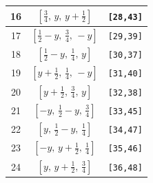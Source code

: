 \documentclass[fleqn,8pt]{jsarticle}
\begin{document}
\begin{longtable}{ccc}
16 & $\left[ \frac{3}{4},\, y,\, y + \frac{1}{2} \right]$ & {\tt [28,43]} \\ \hline
17 & $\left[ \frac{1}{2} - y,\, \frac{3}{4},\, - y \right]$ & {\tt [29,39]} \\ \hline
18 & $\left[ \frac{1}{2} - y,\, \frac{1}{4},\, y \right]$ & {\tt [30,37]} \\ \hline
19 & $\left[ y + \frac{1}{2},\, \frac{1}{4},\, - y \right]$ & {\tt [31,40]} \\ \hline
20 & $\left[ y + \frac{1}{2},\, \frac{3}{4},\, y \right]$ & {\tt [32,38]} \\ \hline
21 & $\left[ - y,\, \frac{1}{2} - y,\, \frac{3}{4} \right]$ & {\tt [33,45]} \\ \hline
22 & $\left[ y,\, \frac{1}{2} - y,\, \frac{1}{4} \right]$ & {\tt [34,47]} \\ \hline
23 & $\left[ - y,\, y + \frac{1}{2},\, \frac{1}{4} \right]$ & {\tt [35,46]} \\ \hline
24 & $\left[ y,\, y + \frac{1}{2},\, \frac{3}{4} \right]$ & {\tt [36,48]} \\
\end{longtable}
\renewcommand{\arraystretch}{1.2}
\end{document}
